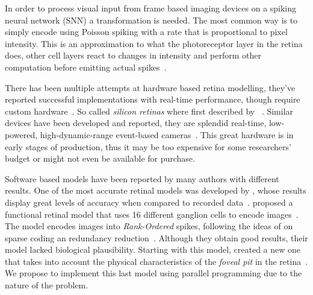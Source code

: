 In order to process visual input from frame based imaging devices on a spiking 
neural network (SNN) a transformation is needed. The most common way is to 
simply encode using Poisson spiking with a rate that is proportional to pixel
intensity. This is an approximation to what the photoreceptor layer in the 
retina does, other cell layers react to changes in intensity and perform other 
computation before emitting actual spikes~\cite{webvision}. 

There has been multiple attempts at hardware based retina modelling, they've 
reported successful implementations with real-time performance, though require 
custom hardware~\cite{1465812,4145833,Vogelstein07amultichip}. 
So called \emph{silicon retinas} where first described by 
\citeauthor{carver-mead}~\cite{carver-mead}. Similar devices have been 
developed and reported, they are splendid real-time, low-powered, 
high-dynamic-range event-based cameras~\cite{aer-retina-bernabe, dvs-zurich}. 
This great hardware is in early stages of production, thus it may be too 
expensive for some researchers' budget or might not even be available for 
purchase.

Software based models have been reported by many authors with different 
results. One of the most accurate retinal models was developed by 
\citeauthor{virtual-retina}, whose results display
great levels of accuracy when compared to recorded data~\cite{virtual-retina}. 
\citeauthor{thorpe-rate-coding-theory} proposed a functional retinal model 
that uses 16 different ganglion cells to encode
images~\cite{thorpe-rate-coding-theory}. The model encodes images into 
\emph{Rank-Ordered} spikes, following the ideas of 
\citeauthor{field-sensory-coding} on sparse coding an redundancy
reduction~\cite{field-sensory-coding}. Although they obtain good results, their 
model lacked biological plausibility. Starting with this model, 
\citeauthor{basab-model} created a new one that takes into account the physical 
characteristics of the \emph{foveal pit} in the retina~\cite{basab-model}. We 
propose to implement this last model using parallel programming due to the 
nature of the problem. 
